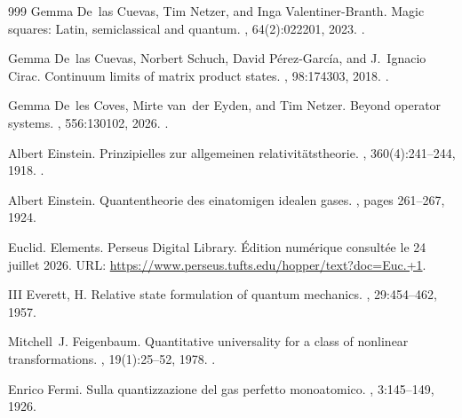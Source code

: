 \begin{thebibliography}{999}
Gemma De~las Cuevas, Tim Netzer, and Inga Valentiner-Branth.
\newblock Magic squares: Latin, semiclassical and quantum.
, 64(2):022201, 2023.
\newblock \href {https://doi.org/10.1063/5.0127393}
  {}.

Gemma De~las Cuevas, Norbert Schuch, David P{\'e}rez-Garc{\'i}a, and J.~Ignacio
  Cirac.
\newblock Continuum limits of matrix product states.
, 98:174303, 2018.
\newblock \href {https://doi.org/10.1103/PhysRevB.98.174303}
  {}.

Gemma De~les Coves, Mirte van~der Eyden, and Tim Netzer.
\newblock Beyond operator systems.
, 556:130102,
  2026.
\newblock \href {https://doi.org/10.1016/j.jmaa.2025.130102}
  {}.

Albert Einstein.
\newblock Prinzipielles zur allgemeinen relativitätstheorie.
, 360(4):241--244, 1918.
\newblock \href {https://doi.org/10.1002/andp.19183600402}
  {}.

Albert Einstein.
\newblock Quantentheorie des einatomigen idealen gases.
,
  pages 261--267, 1924.

Euclid.
\newblock Elements.
\newblock Perseus Digital Library.
\newblock Édition numérique consultée le 24 juillet 2026.
\newblock URL: \url{https://www.perseus.tufts.edu/hopper/text?doc=Euc.+1}.

III Everett, H.
\newblock Relative state formulation of quantum mechanics.
, 29:454--462, 1957.

Mitchell~J. Feigenbaum.
\newblock Quantitative universality for a class of nonlinear transformations.
, 19(1):25--52, 1978.
\newblock \href {https://doi.org/10.1007/BF01020332}
  {}.

Enrico Fermi.
\newblock Sulla quantizzazione del gas perfetto monoatomico.
, 3:145--149, 1926.


\end{thebibliography}
